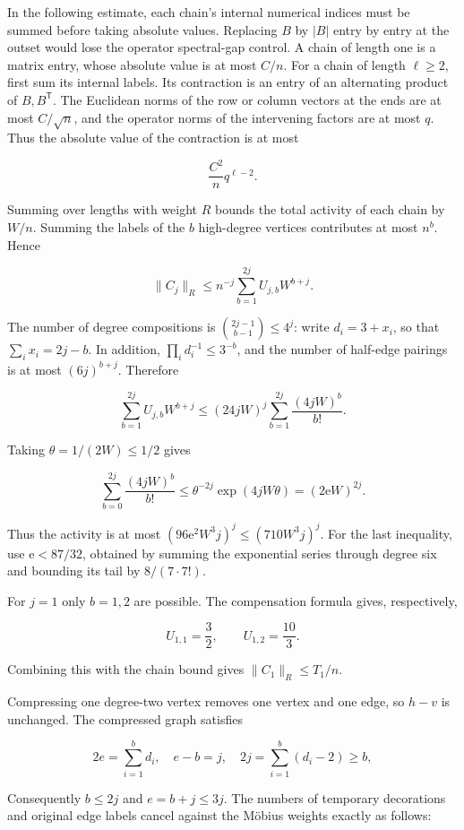 \documentclass[11pt,a4paper]{article}
\begin{document}
In the following estimate, each chain's internal numerical indices must be summed before taking absolute values. Replacing \(B\) by \(|B|\) entry by entry at the outset would lose the operator spectral-gap control. A chain of length one is a matrix entry, whose absolute value is at most \(C/n\). For a chain of length \(\ell\ge2\), first sum its internal labels. Its contraction is an entry of an alternating product of \(B,B^{\mathsf T}\). The Euclidean norms of the row or column vectors at the ends are at most \(C/\sqrt n\), and the operator norms of the intervening factors are at most \(q\). Thus the absolute value of the contraction is at most

\[
\frac{C^2}{n}q^{\ell-2}.
\]

Summing over lengths with weight \(R\) bounds the total activity of each chain by \(W/n\). Summing the labels of the \(b\) high-degree vertices contributes at most \(n^b\). Hence

\[
\|C_j\|_R\le n^{-j}
\sum_{b=1}^{2j}U_{j,b}W^{b+j}.
\]

The number of degree compositions is \(\binom{2j-1}{b-1}\le4^j\): write \(d_i=3+x_i\), so that \(\sum_i x_i=2j-b\). In addition, \(\prod_i d_i^{-1}\le3^{-b}\), and the number of half-edge pairings is at most \((6j)^{b+j}\). Therefore

\[
\sum_{b=1}^{2j}U_{j,b}W^{b+j}
\le(24jW)^j
\sum_{b=1}^{2j}\frac{(4jW)^b}{b!}.
\]

Taking \(\theta=1/(2W)\le1/2\) gives

\[
\sum_{b=0}^{2j}\frac{(4jW)^b}{b!}
\le\theta^{-2j}\exp(4jW\theta)
=(2\mathrm e W)^{2j}.
\]

Thus the activity is at most \((96\mathrm e^2W^3j)^j\le(710W^3j)^j\). For the last inequality, use \(\mathrm e<87/32\), obtained by summing the exponential series through degree six and bounding its tail by \(8/(7\cdot7!)\).

For \(j=1\) only \(b=1,2\) are possible. The compensation formula gives, respectively,

\[
U_{1,1}=\frac32,\qquad U_{1,2}=\frac{10}{3}.
\]

Combining this with the chain bound gives \(\|C_1\|_R\le T_1/n\).

Compressing one degree-two vertex removes one vertex and one edge, so \(h-v\) is unchanged. The compressed graph satisfies

\[
2e=\sum_{i=1}^bd_i,\quad e-b=j,\quad
2j=\sum_{i=1}^b(d_i-2)\ge b,
\]

Consequently \(b\le2j\) and \(e=b+j\le3j\). The numbers of temporary decorations and original edge labels cancel against the Möbius weights exactly as follows:
\end{document}
